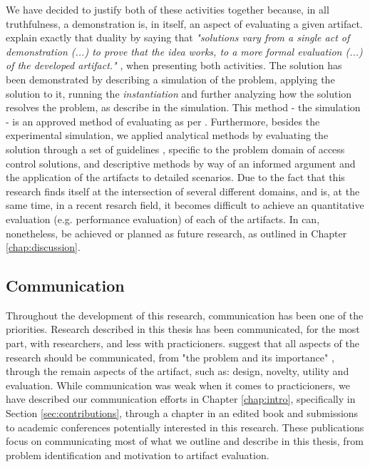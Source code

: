 We have decided to justify both of these activities together because, in all truthfulness, a demonstration is, in itself, an aspect of evaluating a given artifact. \citeauthor{peffers_design_2007} explain exactly that duality by saying that \textit{"solutions vary from a single act of demonstration (...) to prove that the idea works, to a more formal evaluation (...) of the developed artifact."} \cite[13]{peffers_design_2007}, when presenting both activities. The solution has been demonstrated by describing a simulation of the problem, applying the solution to it, running the \textit{instantiation} and further analyzing how the solution resolves the problem, as describe in the simulation. This method - the simulation - is an approved method of evaluating as per \citeauthor{hevner_design_2004} \cite[13]{hevner_design_2004}. Furthermore, besides the experimental simulation, we applied analytical methods by evaluating the solution through a set of guidelines \cite{hu_guidelines_2012}, specific to the problem domain of access control solutions, and descriptive methods by way of an informed argument and the application of the artifacts to detailed scenarios. Due to the fact that this research finds itself at the intersection of several different domains, and is, at the same time, in a recent resarch field, it becomes difficult to achieve an quantitative evaluation (e.g. performance evaluation) of each of the artifacts. In can, nonetheless, be achieved or planned as future research, as outlined in Chapter \ref{chap:discussion}.

\subsection{Communication}

Throughout the development of this research, communication has been one of the priorities. Research described in this thesis has been communicated, for the most part, with researchers, and less with practicioners. \citeauthor{peffers_design_2007} suggest that all aspects of the research should be communicated, from "the problem and its importance" \cite[14]{peffers_design_2007}, through the remain aspects of the artifact, such as: design, novelty, utility and evaluation. While communication was weak when it comes to practicioners, we have described our communication efforts in Chapter \ref{chap:intro}, specifically in Section \ref{sec:contributions}, through a chapter in an edited book \cite{bryan_christiansen_access_2018} and submissions to academic conferences potentially interested in this research. These publications focus on communicating most of what we outline and describe in this thesis, from problem identification and motivation to artifact evaluation.